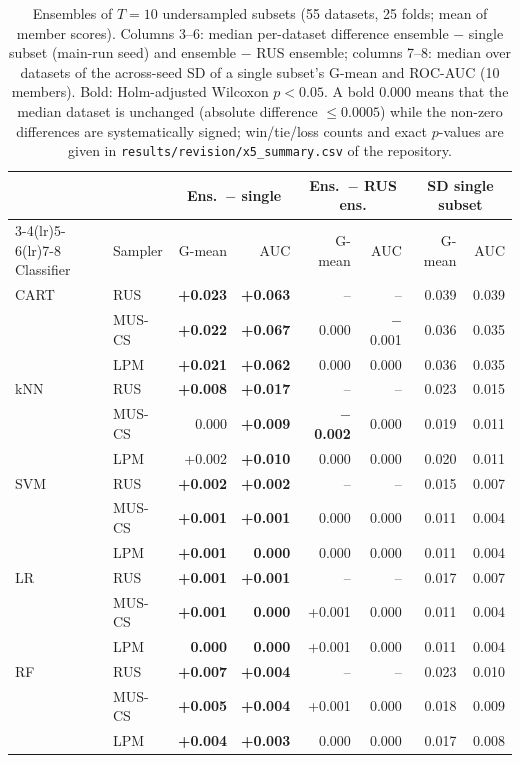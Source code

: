 \begin{table}[htbp]
\centering\footnotesize
\setlength{\tabcolsep}{3.5pt}
\caption{Ensembles of $T=10$ undersampled subsets (55 datasets, 25 folds; mean of member scores). Columns 3--6: median per-dataset difference ensemble $-$ single subset (main-run seed) and ensemble $-$ RUS ensemble; columns 7--8: median over datasets of the across-seed SD of a single subset's G-mean and ROC-AUC (10 members). Bold: Holm-adjusted Wilcoxon $p<0.05$. A bold 0.000 means that the median dataset is unchanged (absolute difference $\leq 0.0005$) while the non-zero differences are systematically signed; win/tie/loss counts and exact $p$-values are given in \texttt{results/revision/x5\_summary.csv} of the repository.}
\label{tab:x5}
\begin{tabular}{llrrrrrr}
\toprule
 & & \multicolumn{2}{c}{Ens.\ $-$ single} & \multicolumn{2}{c}{Ens.\ $-$ RUS ens.} & \multicolumn{2}{c}{SD single subset}\\
\cmidrule(lr){3-4}\cmidrule(lr){5-6}\cmidrule(lr){7-8}
Classifier & Sampler & G-mean & AUC & G-mean & AUC & G-mean & AUC\\
\midrule
CART & RUS & \textbf{+0.023} & \textbf{+0.063} & -- & -- & 0.039 & 0.039\\
 & MUS-CS & \textbf{+0.022} & \textbf{+0.067} & 0.000 & $-$0.001 & 0.036 & 0.035\\
 & LPM & \textbf{+0.021} & \textbf{+0.062} & 0.000 & 0.000 & 0.036 & 0.035\\
\addlinespace
kNN & RUS & \textbf{+0.008} & \textbf{+0.017} & -- & -- & 0.023 & 0.015\\
 & MUS-CS & 0.000 & \textbf{+0.009} & \textbf{$-$0.002} & 0.000 & 0.019 & 0.011\\
 & LPM & +0.002 & \textbf{+0.010} & 0.000 & 0.000 & 0.020 & 0.011\\
\addlinespace
SVM & RUS & \textbf{+0.002} & \textbf{+0.002} & -- & -- & 0.015 & 0.007\\
 & MUS-CS & \textbf{+0.001} & \textbf{+0.001} & 0.000 & 0.000 & 0.011 & 0.004\\
 & LPM & \textbf{+0.001} & \textbf{0.000} & 0.000 & 0.000 & 0.011 & 0.004\\
\addlinespace
LR & RUS & \textbf{+0.001} & \textbf{+0.001} & -- & -- & 0.017 & 0.007\\
 & MUS-CS & \textbf{+0.001} & \textbf{0.000} & +0.001 & 0.000 & 0.011 & 0.004\\
 & LPM & \textbf{0.000} & \textbf{0.000} & +0.001 & 0.000 & 0.011 & 0.004\\
\addlinespace
RF & RUS & \textbf{+0.007} & \textbf{+0.004} & -- & -- & 0.023 & 0.010\\
 & MUS-CS & \textbf{+0.005} & \textbf{+0.004} & +0.001 & 0.000 & 0.018 & 0.009\\
 & LPM & \textbf{+0.004} & \textbf{+0.003} & 0.000 & 0.000 & 0.017 & 0.008\\
\bottomrule
\end{tabular}
\end{table}
